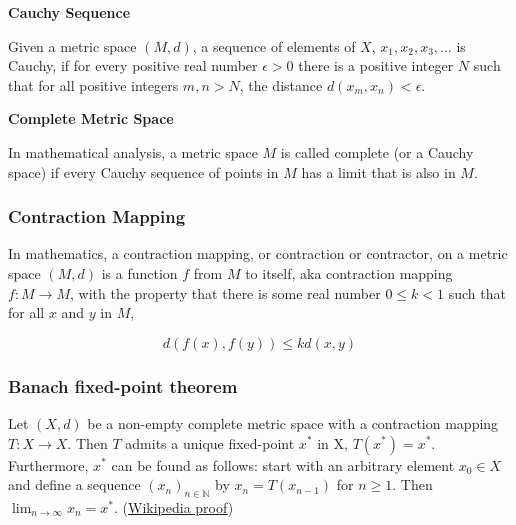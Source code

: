 \documentclass{article}
\begin{document}
\textbf{Cauchy Sequence}

Given a metric space \((M, d)\), a sequence of elements of \(X\), \(x_1, x_2, x_3, \dots\) is Cauchy, 
if for every positive real number \(\epsilon > 0\) there is a positive integer \(N\) such that for all positive integers \(m, n > N\), the distance \(d(x_{m},x_{n}) < \epsilon\).

\textbf{Complete Metric Space}

In mathematical analysis, a metric space \(M\) is called complete (or a Cauchy space) if every Cauchy sequence of points in \(M\) has a limit that is also in \(M\).

\subsubsection{Contraction Mapping}

In mathematics, a contraction mapping, or contraction or contractor, on a metric space \((M, d)\) is a function \(f\) from \(M\) to itself, 
aka contraction mapping \(f: M \rightarrow M\), with the property that there is some real number \(0 \leq k < 1\) such that for all \(x\) and \(y\) in \(M\),

\[d(f(x), f(y)) \leq k d(x, y)\]

\subsubsection{Banach fixed-point theorem}

Let \((X, d)\) be a non-empty complete metric space with a contraction mapping \(T:X \rightarrow X\). Then \(T\) admits a unique fixed-point \(x^{*}\) in X, \(T(x^{*})=x^{*}\). 
Furthermore, \(x^{*}\) can be found as follows: start with an arbitrary element \(x_{0} \in X\) and define a sequence \((x_{n})_{n\in \mathbb {N} }\) by \(x_{n}=T(x_{n-1})\) for \(n \geq 1\). 
Then \(\lim _{n\to \infty }x_{n}=x^{*}\). (\href{https://en.wikipedia.org/wiki/Banach_fixed-point_theorem}{Wikipedia proof})

\printindex
\end{document}
